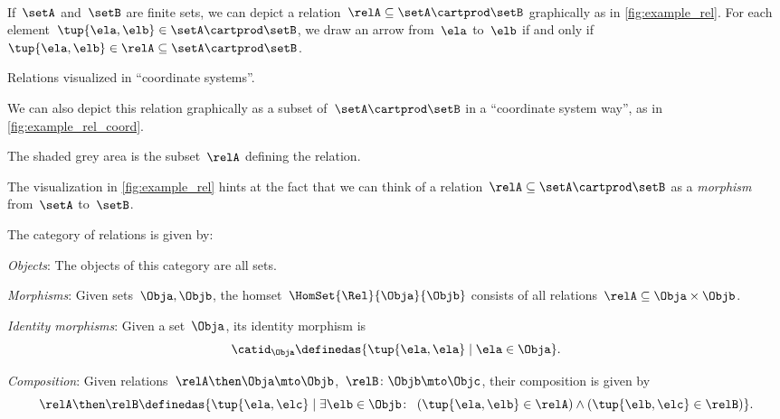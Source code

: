 \


\begin{marginfigure}
  \centering
  \caption{}
  \label{fig:example_rel}
\end{marginfigure}

If~$\setA$ and~$\setB$ are finite sets, we can depict a relation~$\relA \subseteq \setA \cartprod \setB$ graphically as in \cref{fig:example_rel}. For each element~$\tup{\ela,\elb} \in \setA \cartprod \setB$, we draw an arrow from~$\ela$ to~$\elb$ if and only if~$\tup{\ela,\elb} \in \relA \subseteq \setA \cartprod \setB$.


\begin{marginfigure}
  \begin{center}
  \end{center}
  \caption{Relations visualized in ``coordinate systems''.}
  \label{fig:example_rel_coord}
\end{marginfigure}

We can also depict this relation graphically as a subset of~$\setA \cartprod \setB$ in a ``coordinate system way'', as in \cref{fig:example_rel_coord}.

The shaded grey area is the subset~$\relA$ defining the relation.



The visualization in \cref{fig:example_rel} hints at the fact that we can think of a relation~$\relA \subseteq \setA \cartprod \setB$ as a \emph{morphism} from~$\setA$ to~$\setB$.

\begin{ctdefinition}
  \label{def:Rel}
  The category of relations \iindex{\Rel}  is given by:
  \begin{compactenum}
    \item \emph{Objects}: The objects of this category are all sets.
    \item \emph{Morphisms}: Given sets~$\Obja, \Objb$, the homset~$\HomSet{\Rel}{\Obja}{\Objb}$ consists of all
    relations~$\relA\subseteq \Obja\times \Objb$.
    \item \emph{Identity morphisms}: Given a set~$\Obja$, its identity morphism is
    \begin{equation}
      \catid_\Obja \definedas \{ \tup{\ela,\ela} \mid  \ela \in \Obja \}.
    \end{equation}
    \item \emph{Composition}: Given relations~$\relA \then \Obja\mto \Objb$,~$\relB \colon \Objb\mto \Objc$, their composition is given by
    \begin{equation}
      \label{eq:RelCompRule}
      \relA \then \relB \definedas \{\tup{\ela,\elc} \mid  \exists \elb \in \Objb \colon \ \left(\tup{\ela,\elb} \in \relA\right) \wedge \left(\tup{\elb,\elc} \in \relB\right)\}.
    \end{equation}
  \end{compactenum}
\end{ctdefinition}

